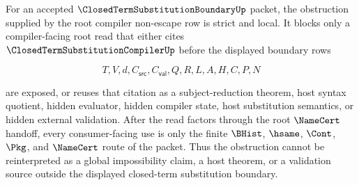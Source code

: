 \begin{corollary}
\label{cor:closed-term-substitution-boundary-root-compiler-strict-local-obstruction}
For an accepted $\ClosedTermSubstitutionBoundaryUp$ packet, the obstruction supplied by the root compiler non-escape row is strict and local. It blocks only a compiler-facing root read that either cites $\ClosedTermSubstitutionCompilerUp$ before the displayed boundary rows

$$
T,V,d,C_{\mathsf{src}},C_{\mathsf{val}},Q,R,L,A,H,C,P,N
$$

are exposed, or reuses that citation as a subject-reduction theorem, host syntax quotient, hidden evaluator, hidden compiler state, host substitution semantics, or hidden external validation. After the read factors through the root $\NameCert$ handoff, every consumer-facing use is only the finite $\BHist$, $\hsame$, $\Cont$, $\Pkg$, and $\NameCert$ route of the packet. Thus the obstruction cannot be reinterpreted as a global impossibility claim, a host theorem, or a validation source outside the displayed closed-term substitution boundary.
\end{corollary}
